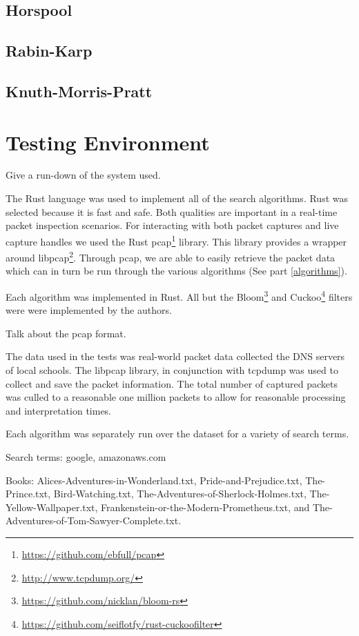 \documentclass{article}
\begin{document}
\subsection{Horspool}
\cite{Horspool1980}
\subsection{Rabin-Karp}
\cite{Karp1987}
\subsection{Knuth-Morris-Pratt}
\cite{Knuth1977}

\section{Testing Environment}	
Give a run-down of the system used.

The Rust language was used to implement all of the search algorithms. Rust was selected because it is fast and safe. Both  qualities are important in a real-time packet inspection scenarios. For interacting with both packet captures and live capture handles we used the Rust pcap\footnote{\url{https://github.com/ebfull/pcap}} library. This library provides a wrapper around libpcap\footnote{\url{http://www.tcpdump.org/}}. Through pcap, we are able to easily retrieve the packet data which can in turn be run through the various algorithms (See part \ref{algorithms}).

Each algorithm was implemented in Rust. All but the Bloom\footnote{\url{https://github.com/nicklan/bloom-rs}} \cite{Bloom1970} and Cuckoo\footnote{\url{https://github.com/seiflotfy/rust-cuckoofilter}} \cite{Fan2014} filters were were implemented by the authors.

Talk about the pcap format.

The data used in the tests was real-world packet data collected the DNS servers of local schools. The libpcap library, in conjunction with tcpdump was used to collect and save the packet information. The total number of captured packets was culled to a reasonable one million packets to allow for reasonable processing and interpretation times.

Each algorithm was separately run over the dataset for a variety of search terms.

Search terms: google, amazonaws.com

Books: Alices-Adventures-in-Wonderland.txt, Pride-and-Prejudice.txt, The-Prince.txt, Bird-Watching.txt, The-Adventures-of-Sherlock-Holmes.txt, The-Yellow-Wallpaper.txt, Frankenstein-or-the-Modern-Prometheus.txt, and The-Adventures-of-Tom-Sawyer-Complete.txt.
\end{document}

